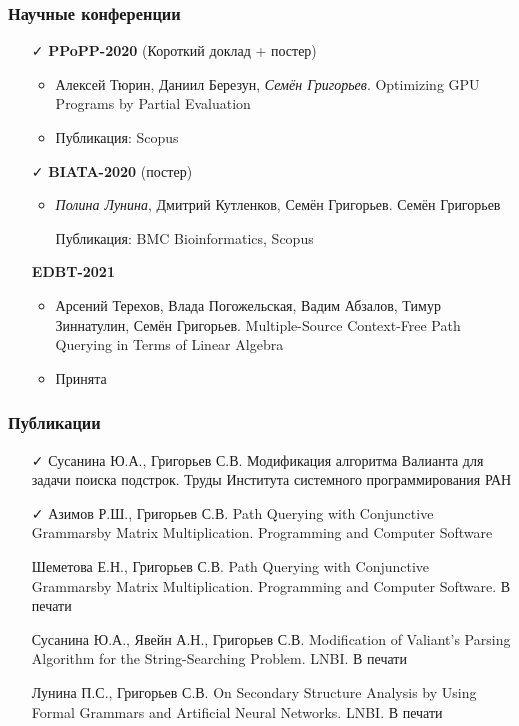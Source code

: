 \documentclass[xcolor=table]{beamer}
\begin{document}
\begin{frame}[fragile]

  \frametitle{Научные конференции}
      \begin{itemize}

      \item[\faCheck] \textbf{PPoPP-2020} (Короткий доклад + постер)
      \begin{itemize}
        \item Алексей Тюрин, Даниил Березун, \emph{Семён Григорьев}. Optimizing GPU Programs by Partial Evaluation
        \item Публикация: Scopus
      \end{itemize}

      \item[\faCheck] \textbf{BIATA-2020} (постер)
      \begin{itemize}
         \item \emph{Полина Лунина}, Дмитрий Кутленков, Семён Григорьев. Семён Григорьев
         \item[\faHourglassHalf] Публикация: BMC Bioinformatics, Scopus
      \end{itemize}

      \item[\faHourglassHalf] \textbf{EDBT-2021} 
      \begin{itemize}
        \item Арсений Терехов, Влада Погожельская, Вадим Абзалов, Тимур Зиннатулин, Семён Григорьев. Multiple-Source Context-Free Path Querying in Terms of Linear Algebra
        \item Принята
      \end{itemize}

\end{itemize}
\end{frame}


\begin{frame}[fragile]

  \frametitle{Публикации}
\begin{itemize}
      \item[\faCheck] Сусанина Ю.А., Григорьев С.В. Модификация алгоритма Валианта для задачи поиска подстрок. Труды Института системного программирования РАН
      \item[\faCheck] Азимов Р.Ш., Григорьев С.В. Path Querying with Conjunctive Grammarsby Matrix Multiplication. Programming and Computer Software
      \item[\faHourglassHalf] Шеметова Е.Н., Григорьев С.В. Path Querying with Conjunctive Grammarsby Matrix Multiplication. Programming and Computer Software. В печати
      \item[\faHourglassHalf] Сусанина Ю.А., Явейн А.Н., Григорьев С.В. Modification of Valiant’s Parsing Algorithm for the String-Searching Problem. LNBI. В печати
      \item[\faHourglassHalf] Лунина П.С., Григорьев С.В. On Secondary Structure Analysis by Using Formal Grammars and Artificial Neural Networks. LNBI. В печати
\end{itemize}
\end{frame}
\end{document}
